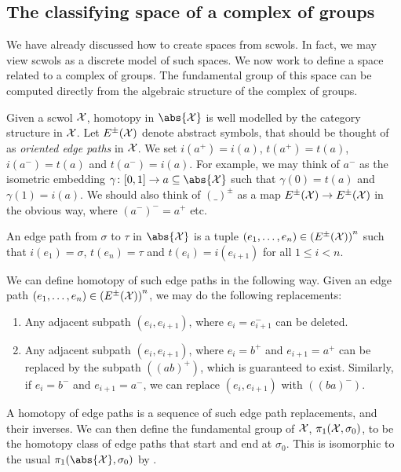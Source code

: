 \subsection{The classifying space of a complex of groups}
We have already discussed how to create spaces from scwols.
In fact, we may view scwols as a discrete model of such spaces.
We now work to define a space related to a complex of groups.
The fundamental group of this space can be computed directly from the algebraic structure of the complex of groups.

Given a scwol $\mathcal{X}$, homotopy in $\abs{\calx}$ is well modelled by the category structure in $\mathcal{X}$.
Let  $E^{\pm}(\mathcal{X})$ denote abstract symbols, that should be thought of as \emph{oriented edge paths} in $\mathcal{X}$.
We set $i(a^+) = i(a)$, $t(a^+) = t(a)$, $i(a^-) = t(a)$ and $t(a^-)= i(a)$.
For example, we may think of $a^-$ as the isometric embedding $\gamma \colon [0,1] \to a \subseteq \abs{\calx}$ such that  $\gamma(0) = t(a)$ and $\gamma(1) = i(a)$.
We should also think of $(\_)^\pm$ as a map $E^\pm(\mathcal{X}) \to E^\pm(\mathcal{X})$ in the obvious way, where  $(a^-)^-= a^+$ etc.
\begin{definition}
	An edge path from $\sigma$ to  $\tau$ in $\abs{\calx}$ is a tuple $(e_1, \ldots, e_n) \in \left(E^\pm(\mathcal{X})\right)^n$ such that $i(e_1)=\sigma$,  $t(e_n)=\tau$ and  $t(e_i) = i(e_{i+1})$ for all  $1 \leq i < n$.
	\label{def:edge_path_in_scwol}
\end{definition}
We can define homotopy of such edge paths in the following way.
Given an edge path $(e_1, \ldots, e_n) \in \left(E^\pm(\mathcal{X})\right)^n$, we may do the following replacements:
\begin{enumerate}
	\item Any adjacent subpath $(e_i,e_{i+1})$, where $e_i=e_{i+1}^-$ can be deleted.
	\item Any adjacent subpath $(e_i,e_{i+1})$, where $e_i = b^+$ and  $e_{i+1}=a^+$ can be replaced by the subpath $((ab)^+)$, which is guaranteed to exist.
	      Similarly, if $e_i = b^-$ and  $e_{i+1}=a^-$, we can replace $(e_i,e_{i+1})$ with  $((ba)^-)$.
\end{enumerate}
A homotopy of edge paths is a sequence of such edge path replacements, and their inverses.
We can then define the fundamental group of $\mathcal{X}$,  $\pi_1(\mathcal{X},\sigma_0)$, to be the homotopy class of edge paths that start and end at  $\sigma_0$.
This is isomorphic to the usual $\pi_1(\abs{\calx}, \sigma_0)$ by \cite[Corollary 4.12]{hatcher_algebraic_2001}.

